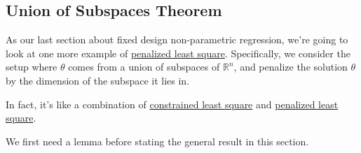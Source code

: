 \subsection{Union of Subspaces Theorem}
As our last section about fixed design non-parametric regression, we're going to look at one more example of \hyperref[prb:penalized-LS]{penalized least square}. Specifically, we consider the setup where \(\theta \) comes from a union of subspaces of \(\mathbb{R} ^n\), and penalize the solution \(\theta \) by the dimension of the subspace it lies in.

\begin{intuition}
	In fact, it's like a combination of \hyperref[prb:constrained-LS]{constrained least square} and \hyperref[prb:penalized-LS]{penalized least square}.
\end{intuition}

We first need a lemma before stating the general result in this section.


